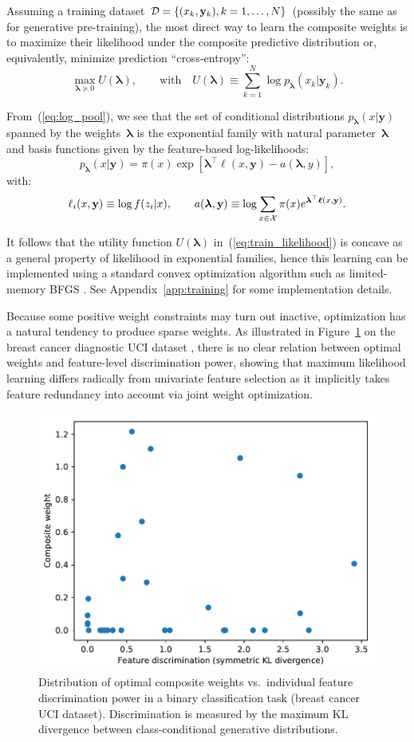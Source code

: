 \documentclass[english]{scrartcl}
\def\y{{\mathbf{y}}}
\newcommand{\blambda}{{\boldsymbol{\lambda}}}
\newcommand{\bell}{{\boldsymbol{\ell}}}
\begin{document}
Assuming a training dataset ${\cal D}=\{(x_k,\y_k), k=1,\ldots,N\}$ (possibly the same as for generative pre-training), the most direct way to learn the composite weights is to maximize their likelihood under the composite predictive distribution or, equivalently, minimize prediction ``cross-entropy'':
\begin{equation}
\label{eq:train_likelihood}
\max_{\blambda\succeq 0} U(\blambda),
\qquad \text{with} \quad
U(\blambda) \equiv\sum_{k=1}^N \log p_\blambda(x_k|\y_k).
\end{equation}

From~(\ref{eq:log_pool}), we see that the set of conditional distributions $p_\blambda(x|\y)$ spanned by the weights~$\blambda$ is the exponential family with natural parameter~$\blambda$ and basis functions given by the feature-based log-likelihoods:
$$
p_\blambda(x|\y) = \pi(x) \exp[\blambda^\top \bell(x,\y) - a(\blambda,y)],
$$
with:
$$
\ell_i(x,\y) \equiv \log f(z_i|x),
\qquad
a(\blambda, \y) \equiv \log \sum_{x\in{\cal X}} \pi(x) e^{\blambda^\top \bell(x,\y)}.
$$

It follows that the utility function $U(\blambda)$ in~(\ref{eq:train_likelihood}) is concave as a general property of likelihood in exponential families, hence this learning can be implemented using a standard convex optimization algorithm such as limited-memory BFGS \cite{Byrd-95}. See Appendix~\ref{app:training} for some implementation details. 

Because some positive weight constraints may turn out inactive, optimization has a natural tendency to produce sparse weights. As illustrated in Figure~\ref{fig:disc_weight_plot} on the breast cancer diagnostic UCI dataset \cite{Wolberg-94}, there is no clear relation between optimal weights and feature-level discrimination power, showing that maximum likelihood learning differs radically from univariate feature selection as it implicitly takes feature redundancy into account via joint weight optimization.

\begin{figure}[!ht]
  \begin{center}
    \includegraphics[width=.7\textwidth]{disc_weight_plot.pdf}
  \end{center}
\caption{Distribution of optimal composite weights vs.~individual feature discrimination power in a binary classification task (breast cancer UCI dataset). Discrimination is measured by the maximum KL divergence between class-conditional generative distributions.}
\label{fig:disc_weight_plot}
\end{figure}
\end{document}

